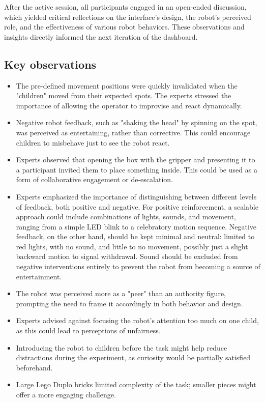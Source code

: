 \documentclass[a4paper]{usiinfbachelorproject}
\begin{document}
After the active session, all participants engaged in an open-ended discussion, which yielded critical reflections on the interface's design, the robot's perceived role, and the effectiveness of various robot behaviors.
These observations and insights directly informed the next iteration of the dashboard.

\subsection*{\textbf{Key observations}}
\begin{itemize}
    \item The pre-defined movement positions were quickly invalidated when the "children" moved from their expected spots. The experts stressed the importance of allowing the operator to improvise and react dynamically.
    \item Negative robot feedback, such as "shaking the head" by spinning on the spot, was perceived as entertaining, rather than corrective. This could encourage children to misbehave just to see the robot react.
    \item Experts observed that opening the box with the gripper and presenting it to a participant invited them to place something inside. This could be used as a form of collaborative engagement or de-escalation.
    \item Experts emphasized the importance of distinguishing between different levels of feedback, both positive and negative.
          For positive reinforcement, a scalable approach could include combinations of lights, sounds, and movement, ranging from a simple LED blink to a celebratory motion sequence.
          Negative feedback, on the other hand, should be kept minimal and neutral: limited to red lights, with no sound, and little to no movement, possibly just a slight backward motion to signal withdrawal.
          Sound should be excluded from negative interventions entirely to prevent the robot from becoming a source of entertainment.
    \item The robot was perceived more as a "peer" than an authority figure, prompting the need to frame it accordingly in both behavior and design.
    \item Experts advised against focusing the robot's attention too much on one child, as this could lead to perceptions of unfairness.
    \item Introducing the robot to children before the task might help reduce distractions during the experiment, as curiosity would be partially satisfied beforehand.
    \item Large Lego Duplo bricks limited complexity of the task; smaller pieces might offer a more engaging challenge.
\end{itemize}
\end{document}
